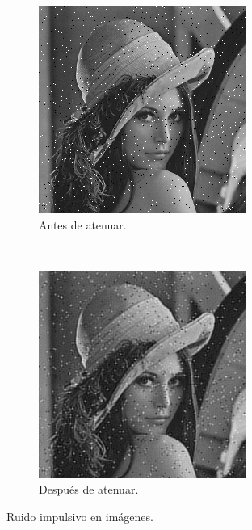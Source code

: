 \documentclass[a4paper,10pt,twoside]{article}
\begin{document}
\begin{figure}[H]
  \centering
  \begin{subfigure}[b]{0.45\textwidth}
    \centering
    \includegraphics[width=\textwidth]{graficos/lena_impulsivo_muestra.png}    
    \caption{Antes de atenuar.}
  \end{subfigure}
  ~ 
  \begin{subfigure}[b]{0.45\textwidth}
    \centering
    \includegraphics[width=\textwidth]{graficos/lena_impulsivo_atenuar_muestra.png}
    \caption{Después de atenuar.}
  \end{subfigure}
  \caption{Ruido impulsivo en imágenes.}
\end{figure}
\end{document}
